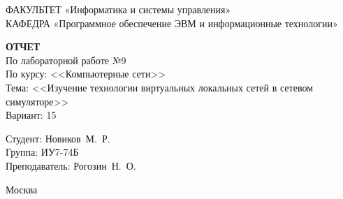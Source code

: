\begin{titlepage}
	{\doublespacing \small \raggedright ФАКУЛЬТЕТ \hspace{25mm} «Информатика и системы управления»\\
	КАФЕДРА \hspace{5mm} «Программное обеспечение ЭВМ и информационные технологии»\\}

	\vspace{30mm}
	
	\textbf{ОТЧЕТ}\\
	По лабораторной работе №9\\
	По курсу: <<Компьютерные сети>>\\
	Тема: <<Изучение технологии виртуальных локальных сетей в сетевом симуляторе>>\\
	Вариант: 15

	\vspace{60mm}

	\hspace{70mm} Студент:       \hfill Новиков~М.~Р.\\
	\hspace{70mm} Группа:        \hfill ИУ7-74Б\\
	\hspace{70mm} Преподаватель: \hfill Рогозин~Н.~О.\\

	\vfill
	
	Москва\\
	\the\year
\end{titlepage}

\setcounter{page}{2}